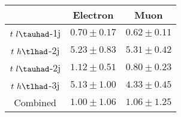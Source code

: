 \centering
\begin{tabular}{|c|c|c|} \hline
 & Electron & Muon\\\hline
$t~{l}\tauhad$-1j & $0.70\pm0.17$ & $0.62\pm0.11$\\\hline
$t~{h}\tlhad$-2j & $5.23\pm0.83$ & $5.31\pm0.42$\\\hline
$t~{l}\tauhad$-2j & $1.12\pm0.51$ & $0.80\pm0.23$\\\hline
$t~{h}\tlhad$-3j & $5.13\pm1.00$ & $4.33\pm0.45$\\\hline
Combined & $1.00\pm1.06$ & $1.06\pm1.25$\\\hline
\end{tabular}
